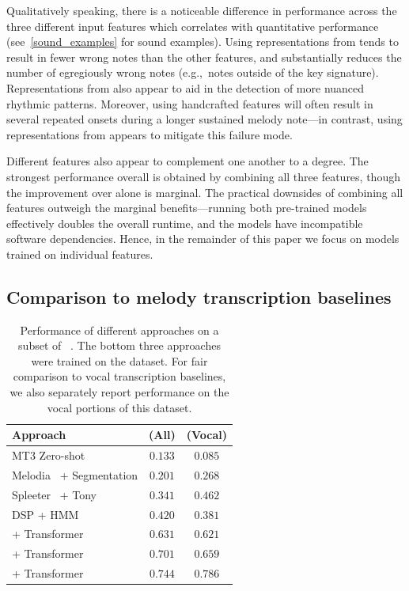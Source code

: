 Qualitatively speaking, there is a noticeable difference in performance across the three different input features which correlates with quantitative performance (see~\cref{sound_examples} for sound examples). 
Using representations from \jukebox{} tends to result in fewer wrong notes than the other features, and substantially reduces the number of egregiously wrong notes (e.g.,~notes outside of the key signature). 
Representations from \jukebox{} also appear to aid in the detection of more nuanced rhythmic patterns. 
Moreover, using handcrafted features will often result in several repeated onsets during a longer sustained melody note---in contrast, using representations from \jukebox{} appears to mitigate this failure mode.

Different features also appear to complement one another to a degree. 
The strongest performance overall is obtained by combining all three features, though the improvement over \jukebox{} alone is marginal. 
The practical downsides of combining all features outweigh the marginal benefits---running both pre-trained models effectively doubles the overall runtime, and the models have incompatible software dependencies. 
Hence, in the remainder of this paper we focus on models trained on individual features.

\subsection{Comparison to melody transcription baselines}


\begin{table}[t]
    \centering
    \begin{tabular}{lcc}
\toprule
Approach & \fone{} (All) & \fone{} (Vocal)\\
\midrule
MT3 Zero-shot~\cite{gardner2021mt3} & $0.133$ & $0.085$ \\
Melodia~\cite{salamon2014melody} + Segmentation & $0.201$ & $0.268$ \\
Spleeter~\cite{hennequin2020spleeter} + Tony~\cite{mauch2015computer} & $0.341$ & $\bm{0.462}$ \\
DSP + HMM~\cite{ryynanen2008automatic} & $\bm{0.420}$ & $0.381$ \\
\midrule
\mel{} + Transformer & $0.631$ & $0.621$ \\
\mtthree{} + Transformer & $0.701$ & $0.659$ \\
\jukebox{} + Transformer & $\mathbf{0.744}$ & $\mathbf{0.786}$ \\
\bottomrule
    \end{tabular}
    \caption{Performance of different approaches on a subset of \rwc~\cite{goto2002rwc,goto2003rwc,goto2004development}. The bottom three approaches were trained on the \hooktheory{} dataset. For fair comparison to vocal transcription baselines, we also separately report performance on the vocal portions of this dataset.}
    \label{tab:rwc_ryy}
\end{table}

